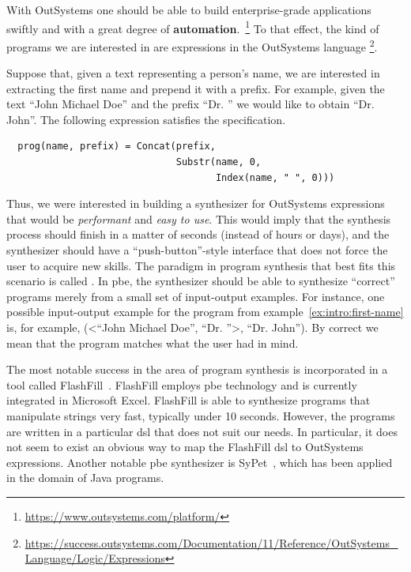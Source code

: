 \noindent
With OutSystems one should be able to build enterprise-grade applications
swiftly and with a great degree of
\textbf{automation}.~\footnote{\url{https://www.outsystems.com/platform/}}
To that effect, the kind of programs we are interested in are expressions in the
OutSystems language
\footnote{\url{https://success.outsystems.com/Documentation/11/Reference/OutSystems_Language/Logic/Expressions}}.

\begin{example}\label{ex:intro:first-name}
  Suppose that, given a text representing a person's name, we are interested in
extracting the first name and prepend it with a prefix. For example, given the
text ``John Michael Doe'' and the prefix ``Dr. '' we would like to obtain
``Dr. John''. The following expression satisfies the specification.
 
\begin{lstlisting}
  prog(name, prefix) = Concat(prefix,
                              Substr(name, 0,
                                     Index(name, " ", 0)))
\end{lstlisting}
\end{example}

Thus, we were interested in building a synthesizer for OutSystems expressions
that would be \textit{performant} and \textit{easy to use}.
This would imply that the synthesis process should finish in a matter of seconds
(instead of hours or days), and the synthesizer should have a
``push-button''-style interface that does not force the user to acquire new
skills.
The paradigm in program synthesis that best fits this scenario is called
.
In \gls{pbe}, the synthesizer should be able to synthesize ``correct'' programs
merely from a small set of input-output examples.
For instance, one possible input-output example for the program from
example~\ref{ex:intro:first-name} is, for example, (<``John Michael Doe'', ``Dr.
''>, ``Dr. John'').
By correct we mean that the program matches what the user had in mind.

The most notable success in the area of program synthesis is incorporated in a
tool called FlashFill~\cite{Gulwani:2011}.
FlashFill employs \gls{pbe} technology and is currently integrated in Microsoft
Excel.
FlashFill is able to synthesize programs that manipulate strings very fast,
typically under 10 seconds.
However, the programs are written in a particular \gls{dsl} that does not suit
our needs.
In particular, it does not seem to exist an obvious way to map the FlashFill
\gls{dsl} to OutSystems expressions.
Another notable \gls{pbe} synthesizer is SyPet~\cite{Feng:2017:CSC}, which has
been applied in the domain of Java programs.

